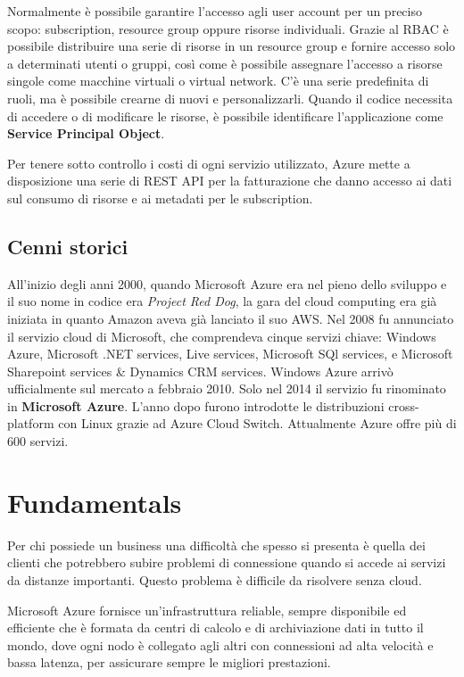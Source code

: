 Normalmente è possibile garantire l'accesso agli user account per un preciso scopo: subscription, resource group oppure risorse individuali. Grazie al RBAC è possibile distribuire una serie di risorse in un resource group e fornire accesso solo a determinati utenti o gruppi, così come è possibile assegnare l'accesso a risorse singole come macchine virtuali o virtual network. C'è una serie predefinita di ruoli, ma è possibile crearne di nuovi e personalizzarli. Quando il codice necessita di accedere o di modificare le risorse, è possibile identificare l'applicazione come \textbf{Service Principal Object}.

Per tenere sotto controllo i costi di ogni servizio utilizzato, Azure mette a disposizione una serie di REST API per la fatturazione che danno accesso ai dati sul consumo di risorse e ai metadati per le subscription. 

\subsection{Cenni storici}
All'inizio degli anni 2000, quando Microsoft Azure era nel pieno dello sviluppo e il suo nome in codice era \textit{Project Red Dog}, la gara del cloud computing era già iniziata in quanto Amazon aveva già lanciato il suo AWS. Nel 2008 fu annunciato il servizio cloud di Microsoft, che comprendeva cinque servizi chiave: Windows Azure, Microsoft .NET services, Live services, Microsoft SQl services, e Microsoft Sharepoint services \& Dynamics CRM services. Windows Azure arrivò ufficialmente sul mercato a febbraio 2010. Solo nel 2014 il servizio fu rinominato in \textbf{Microsoft Azure}. L'anno dopo furono introdotte le distribuzioni cross-platform con Linux grazie ad Azure Cloud Switch. Attualmente Azure offre più di 600 servizi.


\section{Fundamentals}
Per chi possiede un business una difficoltà che spesso si presenta è quella dei clienti che potrebbero subire problemi di connessione quando si accede ai servizi da distanze importanti. Questo problema è difficile da risolvere senza cloud.

Microsoft Azure fornisce un'infrastruttura reliable, sempre disponibile ed efficiente che è formata da centri di calcolo e di archiviazione dati in tutto il mondo, dove ogni nodo è collegato agli altri con connessioni ad alta velocità e bassa latenza, per assicurare sempre le migliori prestazioni. 

